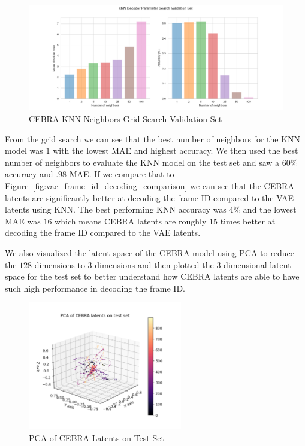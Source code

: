 \documentclass[12pt, letterpaper]{article}
\begin{document}
\begin{figure}[H]
    \centering
    \includegraphics[width=1.0\textwidth]{cebra_latents_knn_decoder_grid_search.png}
    \caption{CEBRA KNN Neighbors Grid Search Validation Set}
    \label{fig:cebra_knn_frame_id_accuracy_mae}
\end{figure}

From the grid search we can see that the best number of neighbors for the KNN model was $1$ with the lowest MAE and highest accuracy. We then used the best number of neighbors to evaluate the KNN model on the test set and saw a $60\%$ accuracy and $.98$ MAE. If we compare that to \hyperref[fig:vae_frame_id_decoding_comparison]{Figure~\ref{fig:vae_frame_id_decoding_comparison}} we can see that the CEBRA \cite{schneider2023} latents are significantly better at decoding the frame ID compared to the VAE latents using KNN. The best performing KNN accuracy was $4\%$ and the lowest MAE was $16$ which means CEBRA \cite{schneider2023} latents are roughly $15$ times better at decoding the frame ID compared to the VAE latents. 

We also visualized the latent space of the CEBRA \cite{schneider2023} model using PCA to reduce the $128$ dimensions to $3$ dimensions and then plotted the $3$-dimensional latent space for the test set to better understand how CEBRA \cite{schneider2023} latents are able to have such high performance in decoding the frame ID.

\begin{figure}[H]
    \centering
    \includegraphics[width=0.6\textwidth]{pca_cebra_latents.png}
    \caption{PCA of CEBRA Latents on Test Set}
    \label{fig:cebra_latents_pca}
\end{figure}
\end{document}
